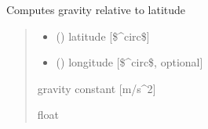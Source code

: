 \documentclass[letterpaper,10pt,english]{sphinxmanual}
\begin{document}
\begin{fulllineitems}
\label{\detokenize{users_guide:AirSeaFluxCode.util_subs.gc}}
\pysigstartsignatures
\pysiglinewithargsret
{}
{\sphinxparamcomma {}}
{}
\pysigstopsignatures
\sphinxAtStartPar
Computes gravity relative to latitude
\begin{quote}\begin{description}
\begin{itemize}
\item {}
\sphinxAtStartPar
{} () \textendash{} latitude {[}\$\textasciicircum{}circ\${]}

\item {}
\sphinxAtStartPar
{} () \textendash{} longitude {[}\$\textasciicircum{}circ\$, optional{]}

\end{itemize}

\sphinxAtStartPar
{} \textendash{} gravity constant {[}m/s\textasciicircum{}2{]}

\sphinxAtStartPar
float

\end{description}\end{quote}

\end{fulllineitems}

\end{document}
